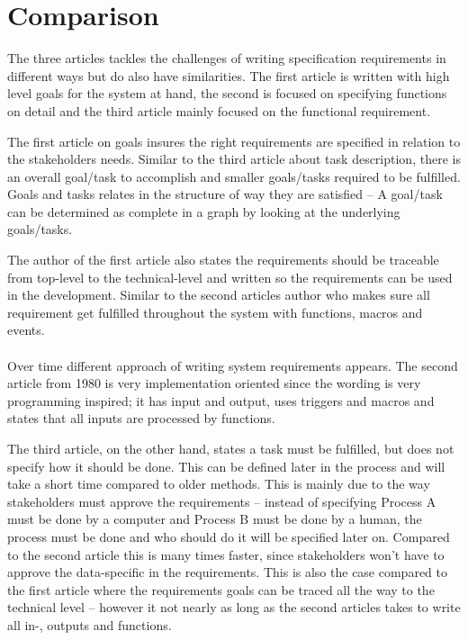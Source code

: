 \documentclass[Main]{subfiles}
\begin{document}
\section{Comparison}
The three articles tackles the challenges of writing specification requirements in different ways but do also have similarities.
The first article  is written with high level goals for the system at hand, the second is focused on specifying functions on detail and the third article mainly focused on the functional requirement.


The first article on goals insures the right requirements are specified in relation to the stakeholders needs. 
Similar to the third article about task description, there is an overall goal/task to accomplish and smaller goals/tasks required to be fulfilled.
Goals and tasks relates in the structure of way they are satisfied -- A goal/task can be determined as complete in a graph by looking at the underlying goals/tasks.

The author of the first article also states the requirements should be traceable from top-level to the technical-level and written so the requirements can be used in the development\cite[p. 3]{Goal}.
Similar to the second articles author who makes sure all requirement get fulfilled throughout the system with functions, macros and events.
\\
\\
Over time different approach of writing system requirements appears.
The second article from 1980\cite{Specifying} is very implementation oriented since the wording is very programming inspired; it has input and output, uses triggers and macros and states that all inputs are processed by functions.

The third article, on the other hand, states a task must be fulfilled, but does not specify how it should be done.
This can be defined later in the process and will take a short time compared to older methods.
This is mainly due to the way stakeholders must approve the requirements -- instead of specifying Process A must be done by a computer and Process B must be done by a human, the process must be done and who should do it will be specified later on.
Compared to the second article this is many times faster, since stakeholders won't have to approve the data-specific in the requirements.
This is also the case compared to the first article where the requirements goals can be traced all the way to the technical level -- however it not nearly as long as the second articles takes to write all in-, outputs and functions.
\end{document}
